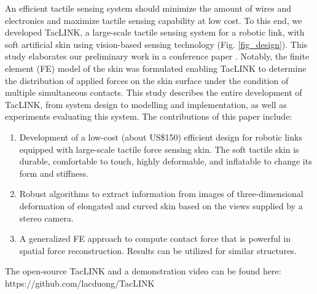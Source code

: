 \documentclass[10pt,letterpaper,journal,final,twoside,twocolumn,nofonttune]{IEEEtran}
\begin{document}
An efficient tactile sensing system should minimize the amount of wires and electronics and maximize tactile sensing capability at low cost. To this end, we developed TacLINK, a large-scale tactile sensing system for a robotic link, with soft artificial skin using vision-based sensing technology (Fig. \ref{fig_design}). This study elaborates our preliminary work in a conference paper \cite{Duong}. Notably, the finite element (FE) model of the skin was formulated enabling TacLINK to determine the distribution of applied forces on the skin surface under the condition of  multiple simultaneous contacts. This study describes the entire development of TacLINK, from system design to modelling and implementation, as well as experiments evaluating this system. The contributions of this paper include:
\begin{enumerate}
\item Development of a low-cost (about US\$150) efficient design for robotic links equipped with large-scale tactile force sensing skin. The soft tactile skin is durable, comfortable to touch, highly deformable, and inflatable to change its form and stiffness. 
\item Robust algorithms to extract information from images of three-dimensional deformation of elongated and curved skin based on the views supplied by a stereo camera.
\item A generalized FE approach to compute contact force that is powerful in spatial force reconstruction. Results can be utilized for similar structures.
\end{enumerate}
The open-source TacLINK and a demonstration video can be found here: https://github.com/lacduong/TacLINK
\end{document}
